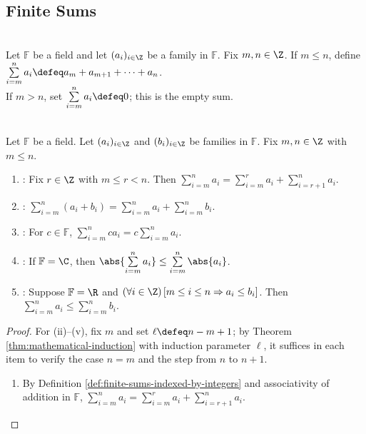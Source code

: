 \subsection{Finite Sums}

\begin{definition} \label{def:finite-sums-indexed-by-integers} \\
Let $\mathbb{F}$ be a field and let $(a_i)_{i\in\Z}$ be a family in $\mathbb{F}$. Fix $m,n\in\Z$. If $m\leq n$, define $\sum\limits_{i=m}^{n}a_i\defeq a_m+a_{m+1}+\cdots+a_n$.\\
If $m>n$, set $\sum\limits_{i=m}^{n}a_i\defeq0$; this is the empty sum.
\end{definition}

\begin{proposition} \label{prop:finite-sum-basic-laws} \\
Let $\mathbb{F}$ be a field. Let $(a_i)_{i\in\Z}$ and $(b_i)_{i\in\Z}$ be families in $\mathbb{F}$. Fix $m,n\in\Z$ with $m\leq n$.
\begin{enumerate}[label=(\roman*)]
\setlength{\itemsep}{0pt}
\item {}: Fix $r\in\Z$ with $m\leq r<n$. Then $\sum\limits_{i=m}^{n}a_i=\sum\limits_{i=m}^{r}a_i+\sum\limits_{i=r+1}^{n}a_i$.
\item {}: $\sum\limits_{i=m}^{n}(a_i+b_i)=\sum\limits_{i=m}^{n}a_i+\sum\limits_{i=m}^{n}b_i$.
\item {}: For $c\in\mathbb{F}$, $\sum\limits_{i=m}^{n}ca_i=c\sum\limits_{i=m}^{n}a_i$.
\item {}: If $\mathbb{F}=\C$, then $\abs{\sum\limits_{i=m}^{n}a_i}\leq\sum\limits_{i=m}^{n}\abs{a_i}$.
\item {}: Suppose $\mathbb{F}=\R$ and $(\forall i\in\Z)\,[m\leq i\leq n\Rightarrow a_i\leq b_i]$. Then $\sum\limits_{i=m}^{n}a_i\leq\sum\limits_{i=m}^{n}b_i$.
\end{enumerate}
\begin{proof} For (ii)--(v), fix $m$ and set $\ell\defeq n-m+1$; by Theorem \ref{thm:mathematical-induction} with induction parameter $\ell$, it suffices in each item to verify the case $n=m$ and the step from $n$ to $n+1$.
\begin{enumerate}[label=(\roman*)]
\setlength{\itemsep}{0pt}
\item By Definition \ref{def:finite-sums-indexed-by-integers} and associativity of addition in $\mathbb{F}$, $\sum\limits_{i=m}^{n}a_i=\sum\limits_{i=m}^{r}a_i+\sum\limits_{i=r+1}^{n}a_i$.

\end{enumerate}
\end{proof}
\end{proposition}
